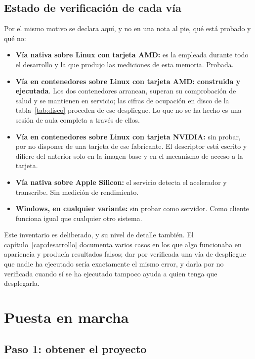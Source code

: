 \subsection*{Estado de verificación de cada vía}

Por el mismo motivo se declara aquí, y no en una nota al pie, qué está probado y qué no:

\begin{itemize}
  \item \textbf{Vía nativa sobre Linux con tarjeta AMD:} es la empleada durante todo el
        desarrollo y la que produjo las mediciones de esta memoria. Probada.
  \item \textbf{Vía en contenedores sobre Linux con tarjeta AMD:} \textbf{construida y
        ejecutada}. Los dos contenedores arrancan, superan su comprobación de salud y se
        mantienen en servicio; las cifras de ocupación en disco de la
        tabla~\ref{tab:disco} proceden de ese despliegue. Lo que no se ha hecho es una
        sesión de aula completa a través de ellos.
  \item \textbf{Vía en contenedores sobre Linux con tarjeta NVIDIA:} sin probar, por no
        disponer de una tarjeta de ese fabricante. El descriptor está escrito y difiere del
        anterior solo en la imagen base y en el mecanismo de acceso a la tarjeta.
  \item \textbf{Vía nativa sobre Apple Silicon:} el servicio detecta el acelerador y
        transcribe. Sin medición de rendimiento.
  \item \textbf{Windows, en cualquier variante:} sin probar como servidor. Como cliente
        funciona igual que cualquier otro sistema.
\end{itemize}

Este inventario es deliberado, y su nivel de detalle también. El
capítulo~\ref{cap:desarrollo} documenta varios casos en los que algo funcionaba en
apariencia y producía resultados falsos; dar por verificada una vía de despliegue que nadie
ha ejecutado sería exactamente el mismo error, y darla por no verificada cuando sí se ha
ejecutado tampoco ayuda a quien tenga que desplegarla.

\section{Puesta en marcha}

\subsection*{Paso 1: obtener el proyecto}

